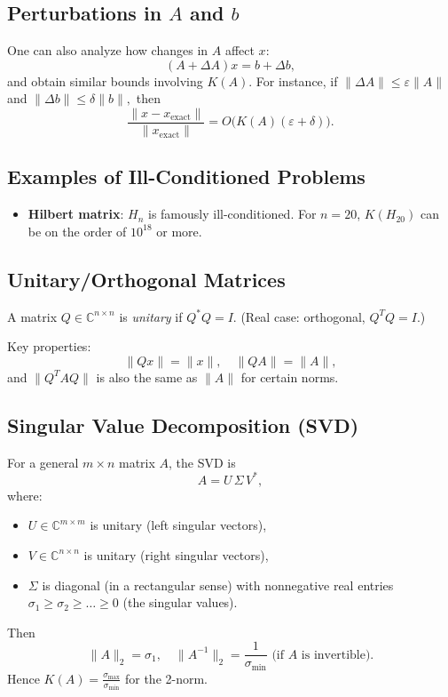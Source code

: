 \subsection*{Perturbations in \texorpdfstring{$A$}{A} and \texorpdfstring{$b$}{b}}

One can also analyze how changes in $A$ affect $x$:
\[
(A + \Delta A)x = b + \Delta b,
\]
and obtain similar bounds involving $K(A)$. For instance, if
\(
\|\Delta A\| \le \varepsilon \|A\|
\)
and
\(
\|\Delta b\| \le \delta \|b\|,
\)
then
\[
\frac{\|x - x_{\mathrm{exact}}\|}{\|x_{\mathrm{exact}}\|}
= O\bigl(K(A)(\varepsilon + \delta)\bigr).
\]

\subsection*{Examples of Ill-Conditioned Problems}

\begin{itemize}
    \item \textbf{Hilbert matrix}: $H_n$ is famously ill-conditioned. For $n=20$, $K(H_{20})$ can be on the order of $10^{18}$ or more.
\end{itemize}

\subsection*{Unitary/Orthogonal Matrices}

A matrix $Q \in \mathbb{C}^{n\times n}$ is \emph{unitary} if $Q^* Q = I$. (Real case: orthogonal, $Q^T Q = I$.) 

Key properties:
\[
\|Qx\| = \|x\|,\quad
\|Q A\| = \|A\|,
\]
and $\|Q^T A Q\|$ is also the same as $\|A\|$ for certain norms. 

\subsection*{Singular Value Decomposition (SVD)}

For a general $m\times n$ matrix $A$, the SVD is
\[
A = U \,\Sigma \,V^*,
\]
where:
\begin{itemize}
    \item $U \in \mathbb{C}^{m\times m}$ is unitary (left singular vectors),
    \item $V \in \mathbb{C}^{n\times n}$ is unitary (right singular vectors),
    \item $\Sigma$ is diagonal (in a rectangular sense) with nonnegative real entries $\sigma_1 \ge \sigma_2 \ge \dots \ge 0$ (the singular values).
\end{itemize}
Then
\[
\|A\|_2 = \sigma_1,
\quad
\|A^{-1}\|_2 = \frac{1}{\sigma_{\min}}\text{ (if $A$ is invertible).}
\]
Hence $K(A) = \frac{\sigma_{\max}}{\sigma_{\min}}$ for the 2-norm.

